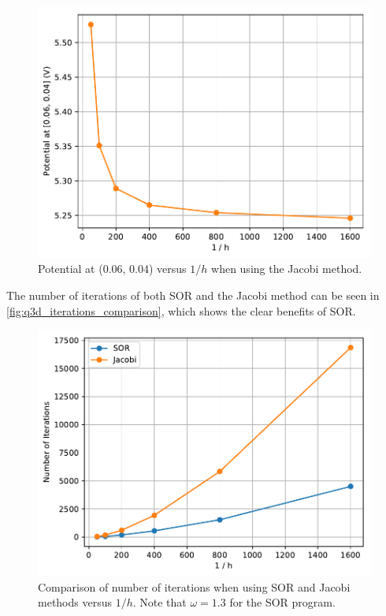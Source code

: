 \documentclass[a4paper,titlepage]{article}
\begin{document}
	\begin{figure}[!htb]
		\centering
		\includegraphics[width=\columnwidth]{plots/q3d_potential.pdf}
		\caption
		{Potential at (0.06, 0.04) versus $1/h$ when using the Jacobi method.}
		\label{fig:q3d_potential}
	\end{figure}

	The number of iterations of both SOR and the Jacobi method can be seen in \autoref{fig:q3d_iterations_comparison}, which shows the clear benefits of SOR.

	\begin{figure}[!htb]
		\centering
		\includegraphics[width=\columnwidth]{plots/q3d_iterations_comparison.pdf}
		\caption
		{Comparison of number of iterations when using SOR and Jacobi methods versus $1/h$. Note that $\omega=1.3$ for the SOR program.}
		\label{fig:q3d_iterations_comparison}
	\end{figure}
	
\end{document}
